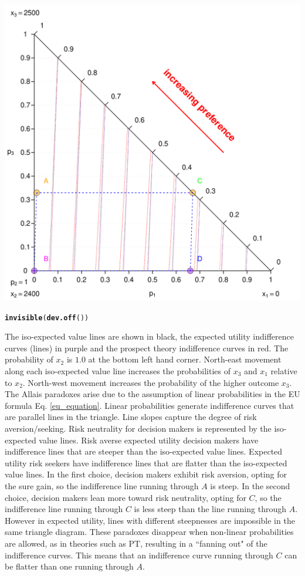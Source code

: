 \documentclass{article}\usepackage[]{graphicx}\usepackage[]{color}
\makeatletter
\newcommand{\hlstd}[1]{\textcolor[rgb]{0.345,0.345,0.345}{#1}}%
\newcommand{\hlkwd}[1]{\textcolor[rgb]{0.737,0.353,0.396}{\textbf{#1}}}%
\newenvironment{kframe}{%
 \def\at@end@of@kframe{}%
 \ifinner\ifhmode%
  \def\at@end@of@kframe{\end{minipage}}%
  \begin{minipage}{\columnwidth}%
 \fi\fi%
 \def\FrameCommand##1{\hskip\@totalleftmargin \hskip-\fboxsep
 \colorbox{shadecolor}{##1}\hskip-\fboxsep
     \hskip-\linewidth \hskip-\@totalleftmargin \hskip\columnwidth}%
 \MakeFramed {\advance\hsize-\width
   \@totalleftmargin\z@ \linewidth\hsize
   \@setminipage}}%
 {\par\unskip\endMakeFramed%
 \at@end@of@kframe}
\newenvironment{knitrout}{}{} %
\makeatother
\begin{document}
\begin{knitrout}
{\centering \includegraphics[width=0.8\linewidth]{figure/unnamed-chunk-8} 

}


\begin{kframe}\begin{alltt}
\hlkwd{invisible}\hlstd{(}\hlkwd{dev.off}\hlstd{())}
\end{alltt}
\end{kframe}
\end{knitrout}


The iso-expected value lines are shown in black, the expected utility indifference curves (lines) in purple and the prospect theory indifference curves in red. The probability of $x_2$ is $1.0$ at the bottom left hand corner. North-east movement along each iso-expected value line increases the probabilities of $x_3$ and $x_1$ relative to $x_2$. North-west movement increases the probability of the higher outcome $x_3$. The Allais paradoxes arise due to the assumption of linear probabilities in the EU formula Eq. \eqref{eu_equation}. Linear probabilities generate
 indifference curves that are parallel lines in the triangle. Line slopes capture the degree of risk aversion/seeking. Risk neutrality for decision makers is represented by the iso-expected value lines. Risk averse expected utility decision makers have indifference lines that are steeper than the iso-expected value lines. Expected utility risk seekers
have indifference lines that are flatter than the iso-expected value lines. In the first choice, decision
makers exhibit risk aversion, opting for the sure gain, so the indifference line running through $A$ is
steep. In the second choice, decision makers lean more toward risk neutrality, opting for $C$, so the indifference line running through $C$ is less steep than the line running through $A$. However in expected utility, lines with different steepnesses are impossible in the same triangle diagram.
These paradoxes disappear when non-linear probabilities are allowed, as in theories such as PT, resulting in a ``fanning out" of the indifference curves. This means that an indifference
curve running through $C$ can be flatter than one running through $A$.
\end{document}
